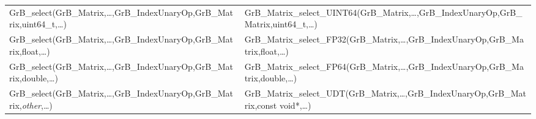 \begin{landscape}
\begin{table}[htb]
{\begin{tabular}{l|l}
{\sf GrB\_select(GrB\_Matrix,\ldots,GrB\_IndexUnaryOp,GrB\_Matrix,uint64\_t,\ldots)}	& {\sf GrB\_Matrix\_select\_UINT64(GrB\_Matrix,\ldots,GrB\_IndexUnaryOp,GrB\_Matrix,uint64\_t,\ldots)} \\
{\sf GrB\_select(GrB\_Matrix,\ldots,GrB\_IndexUnaryOp,GrB\_Matrix,float,\ldots)}		& {\sf GrB\_Matrix\_select\_FP32(GrB\_Matrix,\ldots,GrB\_IndexUnaryOp,GrB\_Matrix,float,\ldots)} \\
{\sf GrB\_select(GrB\_Matrix,\ldots,GrB\_IndexUnaryOp,GrB\_Matrix,double,\ldots)}	    & {\sf GrB\_Matrix\_select\_FP64(GrB\_Matrix,\ldots,GrB\_IndexUnaryOp,GrB\_Matrix,double,\ldots)} \\
{\sf GrB\_select(GrB\_Matrix,\ldots,GrB\_IndexUnaryOp,GrB\_Matrix,\emph{other},\ldots)}	& {\sf GrB\_Matrix\_select\_UDT(GrB\_Matrix,\ldots,GrB\_IndexUnaryOp,GrB\_Matrix,const void*,\ldots)} \\
\hline
\end{tabular}
}
\label{Tab:NonPolymorphic5b2}
\end{table}

\end{landscape}


